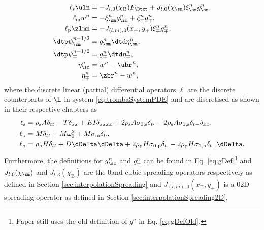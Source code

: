 \begin{subequations}\label{eq:trombaSystemFDS}
    \begin{align}
        \ell_\text{s}\uln &= -J_{l,3}(\chi_\text{B})F_\Btxt + J_{l,0}(\chi_\sm)\xi_\sm^n g^n_\sm,\label{eq:trombaSystemFDSString}\\
        \ell_\text{m}w^n &= - \xi_\sm^n g^n_\sm + \xi_\mp^n g^n_\mp,\label{eq:trombaSystemFDSMass}\\
        \ell_\text{p}\zlmn &= -J_{(l,m),0}(x_\mp, y_\mp)\xi_\mp^n g^n_\mp,\label{eq:trombaSystemFDSPlate}\\
        \dtp\psi^{n-1/2}_\sm &= g^n_\sm \dtd \eta^n_\sm,\label{eq:psiSM}\\
        \dtp\psi^{n-1/2}_\mp &= g^n_\mp \dtd \eta^n_\mp,\label{eq:psiMP}\\
        \eta^n_\sm &= w^n - \ubr^n,\label{eq:etaSM}\\
        \eta^n_\mp &= \zbr^n - w^n,\label{eq:etaMP}
    \end{align}
\end{subequations}
where the discrete linear (partial) differential operators $\ell$ are the discrete counterparts of $\L$ in system \eqref{eq:trombaSystemPDE} and are discretised as shown in their respective chapters as
\begin{subequations}\label{eq:fdsOperators}
\begin{align}
    \ell_\text{s} &=\rho_\text{s}A\delta_{tt}- T\delta_{xx} + EI\delta_{xxxx}+ 2\rho_\text{s}A\sigma_{0,\text{s}}\delta_{t\cdot}-2\rho_\text{s}A\sigma_{1,\text{s}}\delta_{t-}\delta_{xx},\\
    \ell_\text{b} &= M\delta_{tt} + M\omega_0^2 + M\sigma_\text{m} \delta_{t\cdot},\\
    \ell_\text{p} &= \rho_\text{p} H \delta_{tt} + D\dDelta\dDelta + 2\rho_\text{p}H\sigma_{0, \text{p}}\delta_{t\cdot} - 2\rho_\text{p}H\sigma_{1, \text{p}}\delta_{t-}\dDelta.
    \end{align}
\end{subequations}
Furthermore, the definitions for $g_\sm^n$ and $g_\mp^n$ can be found in Eq. \eqref{eq:gDef}\footnote{Paper \citeP[D] still uses the old definition of $g^n$ in Eq. \eqref{eq:gDefOld}.} and $J_{l,0}(\chi_\sm)$ and $J_{l,3}(\chi_\text{B})$ are the $0$\thOrder and cubic spreading operators respectively as defined in Section \ref{sec:interpolationSpreading} and $J_{(l,m),0}(x_\mp, y_\mp)$ is a $0$\thOrder 2D spreading operator as defined in Section \ref{sec:interpolationSpreading2D}.

